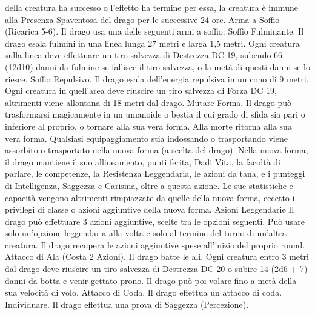 \begin{multicols}{2}
della creatura ha successo o l’effetto ha termine per essa, la creatura è
immune alla Presenza Spaventosa del drago per le successive 24 ore.
Arma a Soffio (Ricarica 5-6). Il drago usa una delle seguenti armi
a soffio:
Soffio Fulminante. Il drago esala fulmini in una linea lunga 27 metri
e larga 1,5 metri. Ogni creatura sulla linea deve effettuare un tiro
salvezza di Destrezza DC 19, subendo 66 (12d10) danni da fulmine
se fallisce il tiro salvezza, o la metà di questi danni se lo riesce.
Soffio Repulsivo. Il drago esala dell’energia repulsiva in un cono di 9
metri. Ogni creatura in quell’area deve riuscire un tiro salvezza di
Forza DC 19, altrimenti viene allontana di 18 metri dal drago.
Mutare Forma. Il drago può trasformarsi magicamente in un
umanoide o bestia il cui grado di sfida sia pari o inferiore al proprio,
o tornare alla sua vera forma. Alla morte ritorna alla sua vera forma.
Qualsiasi equipaggiamento stia indossando o trasportando viene
assorbito o trasportato nella nuova forma (a scelta del drago).
Nella nuova forma, il drago mantiene il suo allineamento, punti
ferita, Dadi Vita, la facoltà di parlare, le competenze, la Resistenza
Leggendaria, le azioni da tana, e i punteggi di Intelligenza, Saggezza
e Carisma, oltre a questa azione. Le sue statistiche e capacità
vengono altrimenti rimpiazzate da quelle della nuova forma, eccetto i
privilegi di classe o azioni aggiuntive della nuova forma.
Azioni Leggendarie
Il drago può effettuare 3 azioni aggiuntive, scelte tra le opzioni
seguenti. Può usare solo un’opzione leggendaria alla volta e solo
al termine del turno di un’altra creatura. Il drago recupera le
azioni aggiuntive spese all’inizio del proprio round.
Attacco di Ala (Costa 2 Azioni). Il drago batte le ali. Ogni
creatura entro 3 metri dal drago deve riuscire un tiro salvezza di
Destrezza DC 20 o subire 14 (2d6 + 7) danni da botta e venir
gettato prono. Il drago può poi volare fino a metà della sua
velocità di volo.
Attacco di Coda. Il drago effettua un attacco di coda.
Individuare. Il drago effettua una prova di Saggezza
(Percezione).
 

\end{multicols}
